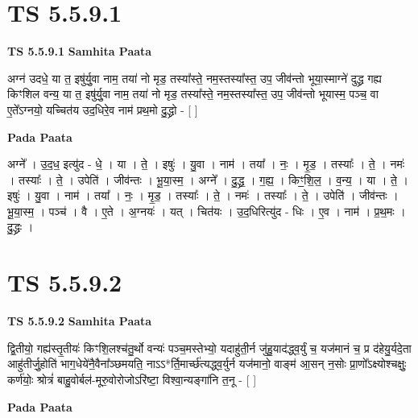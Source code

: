 \documentclass[17pt]{extarticle}
\begin{document}

\section{ TS 5.5.9.1 }

\textbf{TS 5.5.9.1 } \newline
\textbf{Samhita Paata} \newline

अग्न॑ उदधे॒ या त॒ इषु॑र्यु॒वा नाम॒ तया॑ नो मृड॒ तस्या᳚स्ते॒ नम॒स्तस्या᳚स्त॒ उप॒ जीव॑न्तो भूया॒स्माग्ने॑ दुद्ध्र गह्य किꣳशिल वन्य॒ या त॒ इषु॑र्यु॒वा नाम॒ तया॑ नो मृड॒ तस्या᳚स्ते॒ नम॒स्तस्या᳚स्त॒ उप॒ जीव॑न्तो भूयास्म॒ पञ्च॒ वा ए॒ते᳚ऽग्नयो॒ यच्चित॑य उद॒धिरे॒व नाम॑ प्रथ॒मो दु॒द्ध्रो - [  ] \newline

\textbf{Pada Paata} \newline

अग्ने᳚ । उ॒द॒ध॒ इत्यु॑द - धे॒ । या । ते॒ । इषुः॑ । यु॒वा । नाम॑ । तया᳚ । नः॒ । मृ॒ड॒ । तस्याः᳚ । ते॒ । नमः॑ । तस्याः᳚ । ते॒ । उपेति॑ । जीव॑न्तः । भू॒या॒स्म॒ । अग्ने᳚ । दु॒द्ध्र॒ । ग॒ह्य॒ । किꣳ॒॒शि॒ल॒ । व॒न्य॒ । या । ते॒ । इषुः॑ । यु॒वा । नाम॑ । तया᳚ । नः॒ । मृ॒ड॒ । तस्याः᳚ । ते॒ । नमः॑ । तस्याः᳚ । ते॒ । उपेति॑ । जीव॑न्तः । भू॒या॒स्म॒ । पञ्च॑ । वै । ए॒ते । अ॒ग्नयः॑ । यत् । चित॑यः । उ॒द॒धिरित्यु॑द - धिः । ए॒व । नाम॑ । प्र॒थ॒मः । दु॒द्ध्रः ।  \newline





\section{ TS 5.5.9.2 }

\textbf{TS 5.5.9.2 } \newline
\textbf{Samhita Paata} \newline

द्वि॒तीयो॒ गह्य॑स्तृ॒तीयः॑ किꣳशि॒लश्च॑तु॒र्थो वन्यः॑ पञ्च॒मस्तेभ्यो॒ यदाहु॑ती॒र्न जु॑हु॒याद॑द्ध्व॒र्युं च॒ यज॑मानं च॒ प्र द॑हेयु॒र्यदे॒ता आहु॑तीर्जु॒होति॑ भाग॒धेये॑नै॒वैना᳚ञ्छमयति॒ नाऽऽ*र्ति॒मार्च्छ॑त्यद्ध्व॒र्युर्न यज॑मानो॒ वाङ्म॑ आ॒सन् न॒सोः प्रा॒णो᳚ऽक्ष्योश्चक्षुः॒ कर्ण॑योः॒ श्रोत्रं॑ बाहु॒वोर्बल॑-मूरु॒वोरोजोऽरि॑ष्टा॒ विश्वा॒न्यङ्गा॑नि त॒नू - [  ] \newline

\textbf{Pada Paata} \newline
\end{document}
